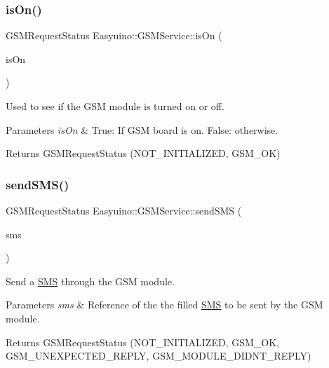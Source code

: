 \subsubsection{\texorpdfstring{is\+On()}{isOn()}}
{\footnotesize\ttfamily G\+S\+M\+Request\+Status Easyuino\+::\+G\+S\+M\+Service\+::is\+On (\begin{DoxyParamCaption}\item[{O\+UT bool \&}]{is\+On }\end{DoxyParamCaption})}



Used to see if the G\+SM module is turned on or off. 


\begin{DoxyParams}{Parameters}
{\em is\+On} & True\+: If G\+SM board is on. False\+: otherwise. \\
\hline
\end{DoxyParams}
\begin{DoxyReturn}{Returns}
G\+S\+M\+Request\+Status (N\+O\+T\+\_\+\+I\+N\+I\+T\+I\+A\+L\+I\+Z\+ED, G\+S\+M\+\_\+\+OK) 
\end{DoxyReturn}
\mbox{\label{class_easyuino_1_1_g_s_m_service_ae860cc330ef552c733d9ab4a5c2fd366}} 
\subsubsection{\texorpdfstring{send\+S\+M\+S()}{sendSMS()}\hspace{0.1cm}{\footnotesize\ttfamily [1/2]}}
{\footnotesize\ttfamily G\+S\+M\+Request\+Status Easyuino\+::\+G\+S\+M\+Service\+::send\+S\+MS (\begin{DoxyParamCaption}\item[{IN \hyperlink{class_easyuino_1_1_s_m_s}{S\+MS} \&}]{sms }\end{DoxyParamCaption})}



Send a \hyperlink{class_easyuino_1_1_s_m_s}{S\+MS} through the G\+SM module. 


\begin{DoxyParams}{Parameters}
{\em sms} & Reference of the the filled \hyperlink{class_easyuino_1_1_s_m_s}{S\+MS} to be sent by the G\+SM module. \\
\hline
\end{DoxyParams}
\begin{DoxyReturn}{Returns}
G\+S\+M\+Request\+Status (N\+O\+T\+\_\+\+I\+N\+I\+T\+I\+A\+L\+I\+Z\+ED, G\+S\+M\+\_\+\+OK, G\+S\+M\+\_\+\+U\+N\+E\+X\+P\+E\+C\+T\+E\+D\+\_\+\+R\+E\+P\+LY, G\+S\+M\+\_\+\+M\+O\+D\+U\+L\+E\+\_\+\+D\+I\+D\+N\+T\+\_\+\+R\+E\+P\+LY) 
\end{DoxyReturn}
\mbox{\label{class_easyuino_1_1_g_s_m_service_ad37d83f2a91fbe2e50a11f1d435eccb5}} 
